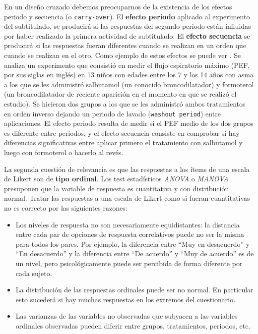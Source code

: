 \documentclass[
  12pt,
  a4paper,
  extrafontsizes,
  onecolumn,
  openright,
  table]{memoir}
\begin{document}
En un diseño cruzado debemos preocuparnos de la existencia de los
efectos periodo y secuencia (o \texttt{carry-over}). El \textbf{efecto
periodo} aplicado al experimento del subtitulado, se producirá si las
respuestas del segundo periodo están influidas por haber realizado la
primera actividad de subtitulado. El \textbf{efecto secuencia} se
producirá si las respuestas fueran diferentes cuando se realizan en un
orden que cuando se realizan en el otro. Como ejemplo de estos efectos
se puede ver \textcite[pp.~35-53]{senn2022}. Se analiza un experimento
que consistió en medir el flujo espiratorio máximo (PEF, por sus siglas
en inglés) en 13 niños con edades entre los 7 y los 14 años con asma a
los que se les administró salbutamol (un conocido broncodilatador) y
formoterol (un broncodilatador de reciente aparición en el momento en
que se realizó el estudio). Se hicieron dos grupos a los que se les
administró ambos tratamientos en orden inverso dejando un periodo de
lavado (\texttt{washout\ period}) entre aplicaciones. El efecto periodo
resulta de medir si el PEF medio de los dos grupos es diferente entre
periodos, y el efecto secuencia consiste en comprobar si hay diferencias
significativas entre aplicar primero el tratamiento con salbutamol y
luego con formoterol o hacerlo al revés.

La segunda cuestión de relevancia es que las respuestas a los ítems de
una escala de Likert son de \textbf{tipo ordinal}. Los test estadísticos
\emph{ANOVA} o \emph{MANOVA} presuponen que la variable de respuesta es
cuantitativa y con distribución normal. Tratar las respuestas a una
escala de Likert como si fueran cuantitativas no es correcto por las
siguientes razones:

\begin{itemize}
\item
  Los niveles de respuesta no son necesariamente equidistantes: la
  distancia entre cada par de opciones de respuesta correlativos puede
  no ser la misma para todos los pares. Por ejemplo, la diferencia entre
  \enquote{Muy en desacuerdo} y \enquote{En desacuerdo} y la diferencia
  entre \enquote{De acuerdo} y \enquote{Muy de acuerdo} es de un nivel,
  pero psicológicamente puede ser percibida de forma diferente por cada
  sujeto.
\item
  La distribución de las respuestas ordinales puede ser no normal. En
  particular esto sucederá si hay muchas respuestas en los extremos del
  cuestionario.
\item
  Las varianzas de las variables no observadas que subyacen a las
  variables ordinales observadas pueden diferir entre grupos,
  tratamientos, periodos, etc.
\end{itemize}
\end{document}
